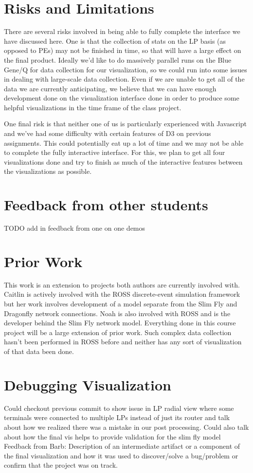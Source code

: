 \documentclass{acm_proc_article-sp}
\begin{document}
\section{Risks and Limitations}
There are several risks involved in being able to fully complete the interface we have discussed here.  One is that the collection of stats on the LP basis (as opposed to PEs) may not be finished in time, so that will have a large effect on the final product.  Ideally we'd like to do massively parallel runs on the Blue Gene/Q for data collection for our visualization, so we could run into some issues in dealing with large-scale data collection.  Even if we are unable to get all of the data we are currently anticipating, we believe that we can have enough development done on the visualization interface done in order to produce some helpful visualizations in the time frame of the class project.

One final risk is that neither one of us is particularly experienced with Javascript and we've had some difficulty with certain features of D3 on previous assignments.   This could potentially eat up a lot of time and we may not be able to complete the fully interactive interface.  For this, we plan to get all four visualizations done and try to finish as much of the interactive features between the visualizations as possible.  
    

\section{Feedback from other students}
\color{red} TODO add in feedback from one on one demos \color{black}

\section{Prior Work}
This work is an extension to projects both authors are currently involved with. Caitlin is actively involved with the ROSS discrete-event simulation framework but her work involves development of a model separate from the Slim Fly and Dragonfly network connections. Noah is also involved with ROSS and is the developer behind the Slim Fly network model. Everything done in this course project will be a large extension of prior work. Such complex data collection hasn't been performed in ROSS before and neither has any sort of visualization of that data been done. 

\section{Debugging Visualization}
\color{red} Could checkout previous commit to show issue in LP radial view where some terminals were connected to multiple LPs instead of just its router and talk about how we realized there was a mistake in our post processing.  Could also talk about how the final vis helps to provide validation for the slim fly model \color{black}
Feedback from Barb: Description of an intermediate artifact or a component of the final visualization and how it was used to discover/solve a bug/problem or confirm that the project was on track.
\end{document}
